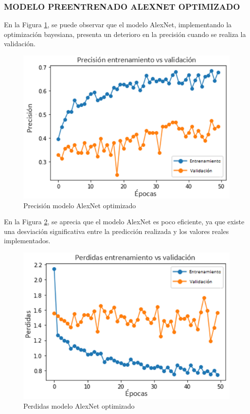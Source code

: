 \subsubsection{\MakeUppercase{Modelo preentrenado AlexNet optimizado}}
En la Figura \ref{fig:preci_Alex_OPT}, se puede observar que el modelo AlexNet, implementando la optimización bayesiana, presenta un deterioro en la precisión cuando se realiza la validación.
\begin{figure}[ht]
	\centering
	\includegraphics[scale=0.8]{Figs/500.png}
	\caption{Precisión modelo AlexNet optimizado}
	\label{fig:preci_Alex_OPT}
\end{figure}

En la Figura \ref{fig:perdda_Alex_opt}, se aprecia que el modelo AlexNet es poco eficiente, ya que existe una desviación significativa entre la predicción realizada y los valores reales implementados.
\begin{figure}[ht]
	\centering
	\includegraphics[scale=0.8]{Figs/501.png}
	\caption{Perdidas modelo AlexNet optimizado}
	\label{fig:perdda_Alex_opt}
\end{figure}

